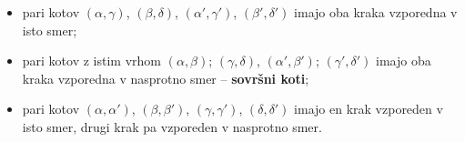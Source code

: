                 \begin{itemize}
                    \item pari kotov $(\alpha, \gamma)$, $(\beta, \delta)$, $(\alpha', \gamma')$, $(\beta', \delta')$ imajo oba kraka vzporedna v isto smer;
                    \item pari kotov z istim vrhom $(\alpha, \beta)$; $(\gamma, \delta)$, $(\alpha', \beta')$; $(\gamma', \delta')$ imajo oba kraka vzporedna v nasprotno smer -- \textbf{sovršni koti};
                    \item pari kotov $(\alpha, \alpha')$, $(\beta, \beta')$, $(\gamma,\gamma')$, $(\delta,\delta')$ imajo en krak vzporeden v isto smer, drugi krak pa vzporeden v nasprotno smer.
                \end{itemize}

                


